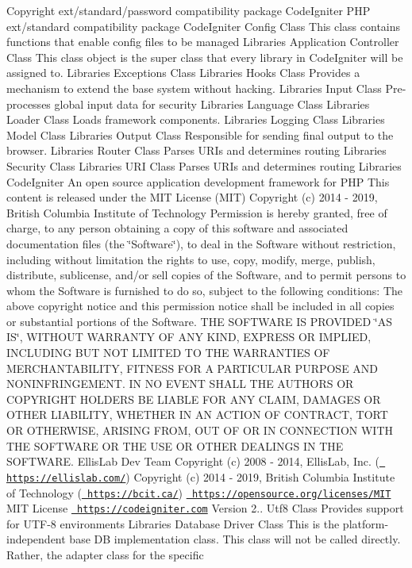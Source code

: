 \begin{DoxyCopyright}{Copyright}
ext/standard/password compatibility package  Code\+Igniter P\+HP ext/standard compatibility package  Code\+Igniter Config Class This class contains functions that enable config files to be managed  Libraries Application Controller Class This class object is the super class that every library in Code\+Igniter will be assigned to.  Libraries Exceptions Class  Libraries Hooks Class Provides a mechanism to extend the base system without hacking.  Libraries Input Class Pre-\/processes global input data for security  Libraries Language Class  Libraries Loader Class Loads framework components.  Libraries Logging Class  Libraries Model Class  Libraries Output Class Responsible for sending final output to the browser.  Libraries Router Class Parses U\+R\+Is and determines routing  Libraries Security Class  Libraries U\+RI Class Parses U\+R\+Is and determines routing  Libraries Code\+Igniter An open source application development framework for P\+HP This content is released under the M\+IT License (M\+IT) Copyright (c) 2014 -\/ 2019, British Columbia Institute of Technology Permission is hereby granted, free of charge, to any person obtaining a copy of this software and associated documentation files (the \char`\"{}\+Software\char`\"{}), to deal in the Software without restriction, including without limitation the rights to use, copy, modify, merge, publish, distribute, sublicense, and/or sell copies of the Software, and to permit persons to whom the Software is furnished to do so, subject to the following conditions\+: The above copyright notice and this permission notice shall be included in all copies or substantial portions of the Software. T\+HE S\+O\+F\+T\+W\+A\+RE IS P\+R\+O\+V\+I\+D\+ED \char`\"{}\+A\+S I\+S\char`\"{}, W\+I\+T\+H\+O\+UT W\+A\+R\+R\+A\+N\+TY OF A\+NY K\+I\+ND, E\+X\+P\+R\+E\+SS OR I\+M\+P\+L\+I\+ED, I\+N\+C\+L\+U\+D\+I\+NG B\+UT N\+OT L\+I\+M\+I\+T\+ED TO T\+HE W\+A\+R\+R\+A\+N\+T\+I\+ES OF M\+E\+R\+C\+H\+A\+N\+T\+A\+B\+I\+L\+I\+TY, F\+I\+T\+N\+E\+SS F\+OR A P\+A\+R\+T\+I\+C\+U\+L\+AR P\+U\+R\+P\+O\+SE A\+ND N\+O\+N\+I\+N\+F\+R\+I\+N\+G\+E\+M\+E\+NT. IN NO E\+V\+E\+NT S\+H\+A\+LL T\+HE A\+U\+T\+H\+O\+RS OR C\+O\+P\+Y\+R\+I\+G\+HT H\+O\+L\+D\+E\+RS BE L\+I\+A\+B\+LE F\+OR A\+NY C\+L\+A\+IM, D\+A\+M\+A\+G\+ES OR O\+T\+H\+ER L\+I\+A\+B\+I\+L\+I\+TY, W\+H\+E\+T\+H\+ER IN AN A\+C\+T\+I\+ON OF C\+O\+N\+T\+R\+A\+CT, T\+O\+RT OR O\+T\+H\+E\+R\+W\+I\+SE, A\+R\+I\+S\+I\+NG F\+R\+OM, O\+UT OF OR IN C\+O\+N\+N\+E\+C\+T\+I\+ON W\+I\+TH T\+HE S\+O\+F\+T\+W\+A\+RE OR T\+HE U\+SE OR O\+T\+H\+ER D\+E\+A\+L\+I\+N\+GS IN T\+HE S\+O\+F\+T\+W\+A\+RE.  Ellis\+Lab Dev Team  Copyright (c) 2008 -\/ 2014, Ellis\+Lab, Inc. (\href{https://ellislab.com/}{\texttt{ https\+://ellislab.\+com/}})  Copyright (c) 2014 -\/ 2019, British Columbia Institute of Technology (\href{https://bcit.ca/}{\texttt{ https\+://bcit.\+ca/}})  \href{https://opensource.org/licenses/MIT}{\texttt{ https\+://opensource.\+org/licenses/\+M\+IT}} M\+IT License  \href{https://codeigniter.com}{\texttt{ https\+://codeigniter.\+com}}  Version 2..  Utf8 Class Provides support for U\+T\+F-\/8 environments  Libraries Database Driver Class This is the platform-\/independent base DB implementation class. This class will not be called directly. Rather, the adapter class for the specific 
\end{DoxyCopyright}
